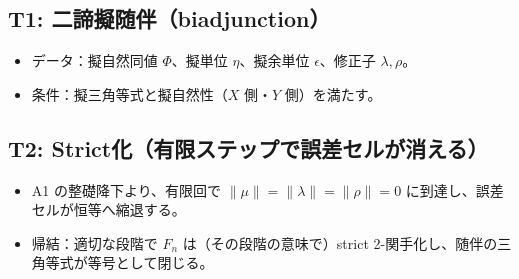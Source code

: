 \documentclass[a4paper,11pt]{article}
\begin{document}
\subsection*{T1: 二諦擬随伴（biadjunction）}
\begin{itemize}
  \item データ：擬自然同値 $\Phi$、擬単位 $\eta$、擬余単位 $\epsilon$、修正子 $\lambda,\rho$。
  \item 条件：擬三角等式と擬自然性（$X$ 側・$Y$ 側）を満たす。
\end{itemize}

\subsection*{T2: Strict化（有限ステップで誤差セルが消える）}
\begin{itemize}
  \item A1 の整礎降下より、有限回で $\|\mu\|=\|\lambda\|=\|\rho\|=0$ に到達し、誤差セルが恒等へ縮退する。
  \item 帰結：適切な段階で $F_n$ は（その段階の意味で）strict 2-関手化し、随伴の三角等式が等号として閉じる。
\end{itemize}
\end{document}
